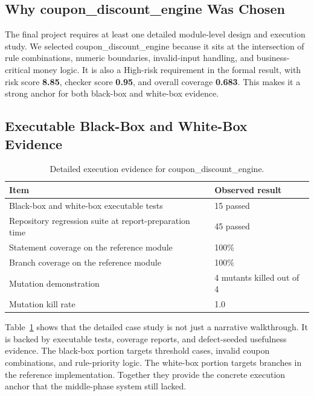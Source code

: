 \documentclass{article}
\renewcommand{\texttt}[1]{{\normalfont #1}}
\begin{document}
\subsection{Why \texttt{coupon\_discount\_engine} Was Chosen}
The final project requires at least one detailed module-level design and execution study. We selected \texttt{coupon\_discount\_engine} because it sits at the intersection of rule combinations, numeric boundaries, invalid-input handling, and business-critical money logic. It is also a High-risk requirement in the formal result, with risk score \textbf{8.85}, checker score \textbf{0.95}, and overall coverage \textbf{0.683}. This makes it a strong anchor for both black-box and white-box evidence.

\subsection{Executable Black-Box and White-Box Evidence}
\begin{table}[h]
\centering
\small
\caption{Detailed execution evidence for \texttt{coupon\_discount\_engine}.}
\label{tab:detailedmodule}
\begin{tabular}{p{} p{}}
\toprule
\textbf{Item} & \textbf{Observed result} \\
\midrule
Black-box and white-box executable tests & 15 passed \\
Repository regression suite at report-preparation time & 45 passed \\
Statement coverage on the reference module & 100\% \\
Branch coverage on the reference module & 100\% \\
Mutation demonstration & 4 mutants killed out of 4 \\
Mutation kill rate & 1.0 \\
\bottomrule
\end{tabular}
\end{table}

Table~\ref{tab:detailedmodule} shows that the detailed case study is not just a narrative walkthrough. It is backed by executable tests, coverage reports, and defect-seeded usefulness evidence. The black-box portion targets threshold cases, invalid coupon combinations, and rule-priority logic. The white-box portion targets branches in the reference implementation. Together they provide the concrete execution anchor that the middle-phase system still lacked.
\end{document}

